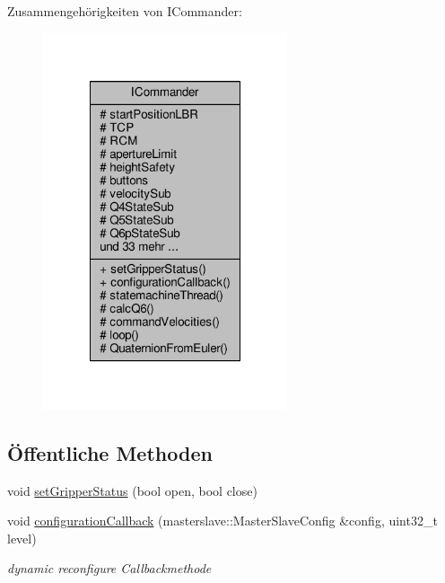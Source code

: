 Zusammengehörigkeiten von I\-Commander\-:
\nopagebreak
\begin{figure}[H]
\begin{center}
\leavevmode
\includegraphics[width=204pt]{classICommander__coll__graph}
\end{center}
\end{figure}
\subsection*{Öffentliche Methoden}
\begin{DoxyCompactItemize}
\item 
void \hyperlink{classICommander_a8a9f1636cbe5526d490266be84e6a57f}{set\-Gripper\-Status} (bool open, bool close)
\item 
void \hyperlink{classICommander_a9c55ba4a6c61efe9dc33ed76fd180a4e}{configuration\-Callback} (masterslave\-::\-Master\-Slave\-Config \&config, uint32\-\_\-t level)
\begin{DoxyCompactList}\small\item\em dynamic reconfigure Callbackmethode \end{DoxyCompactList}\end{DoxyCompactItemize}
